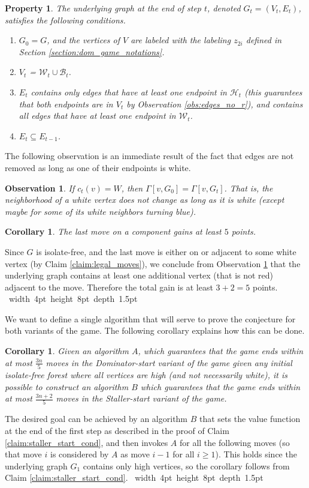 \documentclass[11pt]{article}
\def\Proof{\par\noindent{\bf Proof:~}}
\def\blackslug{\hbox{\hskip 1pt \vrule width 4pt height 8pt
    depth 1.5pt \hskip 1pt}}
\def\QED{\quad\blackslug\lower 8.5pt\null\par}
\def\dnsitem{\vspace{-7pt}\item}
\newtheorem{corollary}[theorem]{Corollary}
\newtheorem{observation}[theorem]{Observation}
\newtheorem{property}[theorem]{Property}
\theoremstyle{definition}
\begin{document}
\begin{property}
\label{prop:underlying_graph}
The \emph{underlying graph} at the end of step $t$, denoted $G_t = (V_t, E_t)$, satisfies the following conditions.
\begin{enumerate}
	\dnsitem $G_0 = G$, and the vertices of $V$ are labeled with the labeling $z_{2i}$ defined in Section \ref{section:dom_game_notations}.
	\dnsitem $V_t$ = $\mathcal{W}_t \cup \mathcal{B}_t$.
	\dnsitem $E_t$ contains only edges that have at least one endpoint in $\mathcal{H}_t$ (this guarantees that both endpoints are in $V_t$ by Observation \ref{obs:edges_no_r}),
	and contains all edges that have at least one endpoint in $\mathcal{W}_t$.
	\dnsitem $E_t \subseteq E_{t-1}$.
\end{enumerate}
\end{property}

The following observation is an immediate result of the fact that edges are not removed as long as one of their endpoints is white.
\begin{observation}
\label{obs:w_neighborhood}
If $c_t(v) = W$, then $\Gamma[v, G_0] = \Gamma[v, G_t]$.
That is, the neighborhood of a white vertex does not change as long as it is  white (except maybe for some of its white neighbors turning blue).
\end{observation}

\begin{corollary}
\label{cor:last_5}
The last move on a component gains at least $5$ points.
\end{corollary}
\Proof
Since $G$ is isolate-free, and the last move is either on or adjacent to some white vertex (by Claim \ref{claim:legal_moves}), 
we conclude from Observation \ref{obs:w_neighborhood} that the underlying graph contains at least one additional vertex (that is not red) adjacent to the move. 
Therefore the total gain is at least $3+2=5$ points.
\QED

We want to define a single algorithm that will serve to prove the conjecture for both variants of the game.
The following corollary explains how this can be done.

\begin{corollary}
\label{cor:dom_stall_start}
Given an algorithm $A$, which guarantees that the game ends within at most $\frac{3n}{5}$ moves in the Dominator-start variant of the game given any initial isolate-free forest where all vertices are high (and not necessarily white), it is possible to construct an algorithm $B$ which guarantees that the game ends within at most $\frac{3n+2}{5}$ moves in the Staller-start variant of the game.
\end{corollary}
\Proof
The desired goal can be achieved by an algorithm $B$ that sets the value function at the end of the first step as described in the proof of Claim \ref{claim:staller_start_cond}, and then invokes $A$ for all the following moves (so that move $i$ is considered by $A$ as move $i-1$ for all $i \geq 1$).
This holds since the underlying graph $G_1$ contains only high vertices, so the corollary follows from Claim \ref{claim:staller_start_cond}.
\QED
\end{document}
